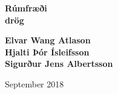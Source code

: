\begin{titlepage}
\begin{center}
	{\huge\bfseries Rúmfræði \\ \normalsize drög}

	\vspace{1.5cm}
	{\Large\bfseries Elvar Wang Atlason \\ Hjalti Þór Ísleifsson \\ Sigurður Jens Albertsson}
	
	\vfill

	\begin{figure}[htbp]
	\centering
	
	\end{figure}

	\vfill


	{September 2018}
\end{center}
\end{titlepage}
